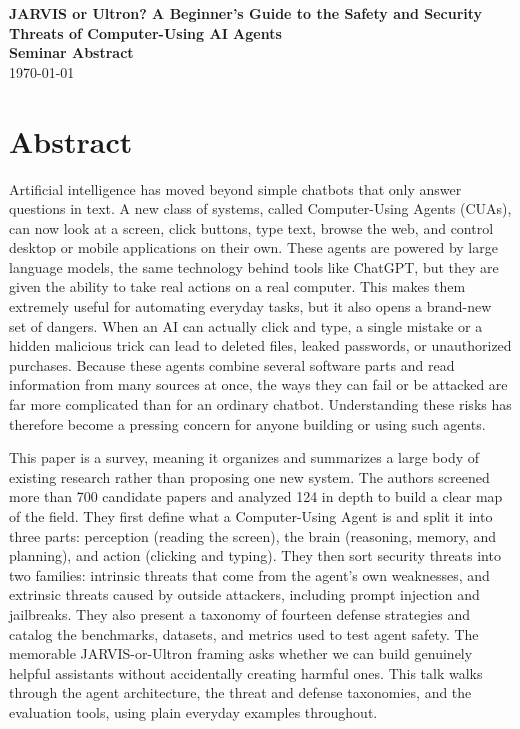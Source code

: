 \documentclass[12pt]{article}
\newcommand{\seminardate}{\today}
\begin{document}
\begin{center}
  {\LARGE\bfseries JARVIS or Ultron? A Beginner's Guide to the Safety and Security Threats of Computer-Using AI Agents}\\[8pt]
  {\large\bfseries Seminar Abstract}\\[6pt]
  {\normalsize \seminardate}
\end{center}
\vspace{1.5em}

\section*{Abstract}
Artificial intelligence has moved beyond simple chatbots that only answer questions in text. A new class of systems, called Computer-Using Agents (CUAs), can now look at a screen, click buttons, type text, browse the web, and control desktop or mobile applications on their own. These agents are powered by large language models, the same technology behind tools like ChatGPT, but they are given the ability to take real actions on a real computer. This makes them extremely useful for automating everyday tasks, but it also opens a brand-new set of dangers. When an AI can actually click and type, a single mistake or a hidden malicious trick can lead to deleted files, leaked passwords, or unauthorized purchases. Because these agents combine several software parts and read information from many sources at once, the ways they can fail or be attacked are far more complicated than for an ordinary chatbot. Understanding these risks has therefore become a pressing concern for anyone building or using such agents.

This paper is a survey, meaning it organizes and summarizes a large body of existing research rather than proposing one new system. The authors screened more than 700 candidate papers and analyzed 124 in depth to build a clear map of the field. They first define what a Computer-Using Agent is and split it into three parts: perception (reading the screen), the brain (reasoning, memory, and planning), and action (clicking and typing). They then sort security threats into two families: intrinsic threats that come from the agent's own weaknesses, and extrinsic threats caused by outside attackers, including prompt injection and jailbreaks. They also present a taxonomy of fourteen defense strategies and catalog the benchmarks, datasets, and metrics used to test agent safety. The memorable JARVIS-or-Ultron framing asks whether we can build genuinely helpful assistants without accidentally creating harmful ones. This talk walks through the agent architecture, the threat and defense taxonomies, and the evaluation tools, using plain everyday examples throughout.
\end{document}
